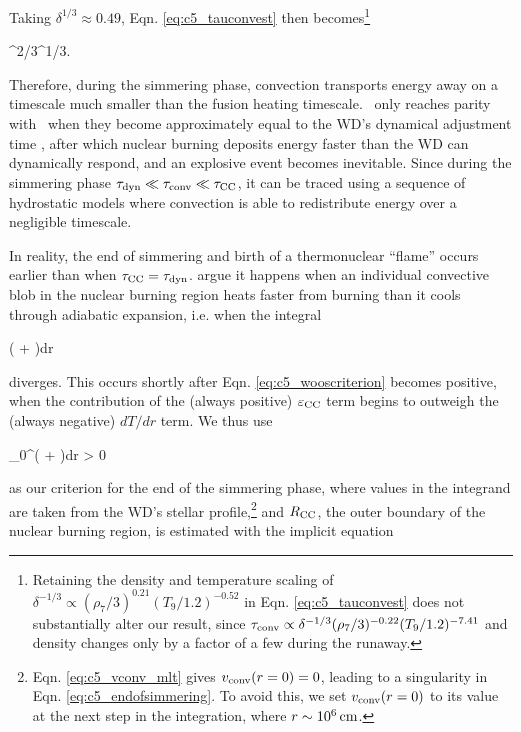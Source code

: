 \noindent Taking $\delta^{1/3} \approx 0.49$, Eqn. \ref{eq:c5_tauconvest} then becomes\footnote{Retaining the density and temperature scaling of $\delta^{-1/3} \propto (\rho_7/3)^{0.21}(T_9/1.2)^{-0.52}$ in Eqn. \ref{eq:c5_tauconvest} does not substantially alter our result, since $\tauconv \propto \delta^{-1/3}(\rho_7/3)^{-0.22}(T_9/1.2)^{-7.41}$ and density changes only by a factor of a few during the runaway.}

\eqbegin
\tauconv {}\taudyn^{2/3}\taucc^{1/3}.
\label{eq:c5_tauconvest2}
\eqend

Therefore, during the simmering phase, convection transports energy away on a timescale much smaller than the fusion heating timescale.  \taucc\ only reaches parity with \tauconv\ when they become approximately equal to the WD's dynamical adjustment time \taudyn, after which nuclear burning deposits energy faster than the WD can dynamically respond, and an explosive event becomes inevitable.  Since during the simmering phase $\taudyn \ll \tauconv \ll \taucc$, it can be traced using a sequence of hydrostatic models where convection is able to redistribute energy over a negligible timescale.

In reality, the end of simmering and birth of a thermonuclear ``flame'' occurs earlier than when $\taucc = \taudyn$.  \citeal{wooswk04} argue it happens when an individual convective blob in the nuclear burning region heats faster from burning than it cools through adiabatic expansion, i.e. when the integral

\eqbegin
\int\left( + \right)dr
\label{eq:c5_wooscriterion}
\eqend

\noindent diverges.  This occurs shortly after Eqn. \ref{eq:c5_wooscriterion} becomes positive, when the contribution of the (always positive) $\epscc$ term begins to outweigh the (always negative) $dT/dr$ term.  We thus use

\eqbegin
\int_0^{\Rcc}\left( + \right)dr > 0
\label{eq:c5_endofsimmering}
\eqend

\noindent as our criterion for the end of the simmering phase, where values in the integrand are taken from the WD's stellar profile,\footnote{Eqn. \ref{eq:c5_vconv_mlt} gives $\vconv(r = 0) = 0$, leading to a singularity in Eqn. \ref{eq:c5_endofsimmering}.  To avoid this, we set $\vconv(r = 0)$ to its value at the next step in the integration, where $r \sim 10^6\,\mathrm{cm}$.} and $\Rcc$, the outer boundary of the nuclear burning region, is estimated with the implicit equation

